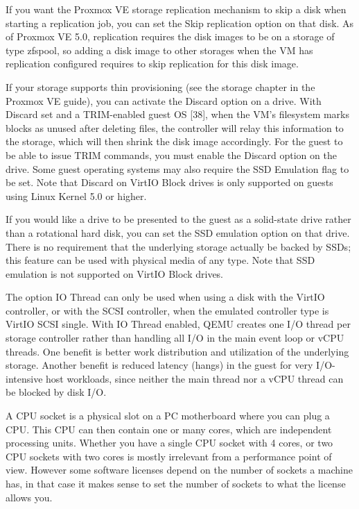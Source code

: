 If you want the Proxmox VE storage replication mechanism to skip a disk when starting a replication job, you can set the Skip replication option on that disk. As of Proxmox VE 5.0, replication requires the disk images to be on a storage of type zfspool, so adding a disk image to other storages when the VM has replication configured requires to skip replication for this disk image.

If your storage supports thin provisioning (see the storage chapter in the Proxmox VE guide), you can activate the Discard option on a drive. With Discard set and a TRIM-enabled guest OS [38], when the VM’s filesystem marks blocks as unused after deleting files, the controller will relay this information to the storage, which will then shrink the disk image accordingly. For the guest to be able to issue TRIM commands, you must enable the Discard option on the drive. Some guest operating systems may also require the SSD Emulation flag to be set. Note that Discard on VirtIO Block drives is only supported on guests using Linux Kernel 5.0 or higher.

If you would like a drive to be presented to the guest as a solid-state drive rather than a rotational hard disk, you can set the SSD emulation option on that drive. There is no requirement that the underlying storage actually be backed by SSDs; this feature can be used with physical media of any type. Note that SSD emulation is not supported on VirtIO Block drives.

The option IO Thread can only be used when using a disk with the VirtIO controller, or with the SCSI controller, when the emulated controller type is VirtIO SCSI single. With IO Thread enabled, QEMU creates one I/O thread per storage controller rather than handling all I/O in the main event loop or vCPU threads. One benefit is better work distribution and utilization of the underlying storage. Another benefit is reduced latency (hangs) in the guest for very I/O-intensive host workloads, since neither the main thread nor a vCPU thread can be blocked by disk I/O.

A CPU socket is a physical slot on a PC motherboard where you can plug a CPU. This CPU can then contain one or many cores, which are independent processing units. Whether you have a single CPU socket with 4 cores, or two CPU sockets with two cores is mostly irrelevant from a performance point of view. However some software licenses depend on the number of sockets a machine has, in that case it makes sense to set the number of sockets to what the license allows you.

